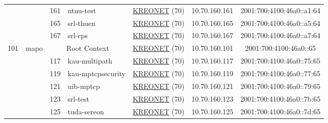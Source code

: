 \begin{small}
\begin{center}
\begin{longtable}{|c|c|c|c|c|c|c|c|}
  &  & \tiny{161} & \multicolumn{1}{|l|}{\tiny{ntnu-test}} & \multicolumn{2}{|c|}{\tiny{\href{http://www.kreonet.net}{KREONET} (70)}} & \tiny{10.70.160.161} & \tiny{2001:700:4100:46a0::a1:64} \\* \cline{3-3}\cline{4-4}\cline{5-5}\cline{6-6}\cline{7-7}\cline{8-8}
  &  & \tiny{165} & \multicolumn{1}{|l|}{\tiny{srl-thuen}} & \multicolumn{2}{|c|}{\tiny{\href{http://www.kreonet.net}{KREONET} (70)}} & \tiny{10.70.160.165} & \tiny{2001:700:4100:46a0::a5:64} \\* \cline{3-3}\cline{4-4}\cline{5-5}\cline{6-6}\cline{7-7}\cline{8-8}
  &  & \tiny{167} & \multicolumn{1}{|l|}{\tiny{srl-cps}} & \multicolumn{2}{|c|}{\tiny{\href{http://www.kreonet.net}{KREONET} (70)}} & \tiny{10.70.160.167} & \tiny{2001:700:4100:46a0::a7:64} \\ \hline
 \multirow{28}{*}{\tiny{101}} & \multicolumn{1}{|l|}{\multirow{28}{*}{\tiny{mapo}}} & \multicolumn{2}{|c|}{\tiny{Root Context}} & \multicolumn{2}{|c|}{\tiny{\href{http://www.kreonet.net}{KREONET} (70)}} & \tiny{10.70.160.101} & \tiny{2001:700:4100:46a0::65} \\* \cline{3-3}\cline{4-4}\cline{5-5}\cline{6-6}\cline{7-7}\cline{8-8}
  &  & \tiny{117} & \multicolumn{1}{|l|}{\tiny{kau-multipath}} & \multicolumn{2}{|c|}{\tiny{\href{http://www.kreonet.net}{KREONET} (70)}} & \tiny{10.70.160.117} & \tiny{2001:700:4100:46a0::75:65} \\* \cline{3-3}\cline{4-4}\cline{5-5}\cline{6-6}\cline{7-7}\cline{8-8}
  &  & \tiny{119} & \multicolumn{1}{|l|}{\tiny{kau-mptcpsecurity}} & \multicolumn{2}{|c|}{\tiny{\href{http://www.kreonet.net}{KREONET} (70)}} & \tiny{10.70.160.119} & \tiny{2001:700:4100:46a0::77:65} \\* \cline{3-3}\cline{4-4}\cline{5-5}\cline{6-6}\cline{7-7}\cline{8-8}
  &  & \tiny{121} & \multicolumn{1}{|l|}{\tiny{uib-mptcp}} & \multicolumn{2}{|c|}{\tiny{\href{http://www.kreonet.net}{KREONET} (70)}} & \tiny{10.70.160.121} & \tiny{2001:700:4100:46a0::79:65} \\* \cline{3-3}\cline{4-4}\cline{5-5}\cline{6-6}\cline{7-7}\cline{8-8}
  &  & \tiny{123} & \multicolumn{1}{|l|}{\tiny{srl-test}} & \multicolumn{2}{|c|}{\tiny{\href{http://www.kreonet.net}{KREONET} (70)}} & \tiny{10.70.160.123} & \tiny{2001:700:4100:46a0::7b:65} \\* \cline{3-3}\cline{4-4}\cline{5-5}\cline{6-6}\cline{7-7}\cline{8-8}
  &  & \tiny{125} & \multicolumn{1}{|l|}{\tiny{tuda-sereon}} & \multicolumn{2}{|c|}{\tiny{\href{http://www.kreonet.net}{KREONET} (70)}} & \tiny{10.70.160.125} & \tiny{2001:700:4100:46a0::7d:65} \\* \cline{3-3}\cline{4-4}\cline{5-5}\cline{6-6}\cline{7-7}\cline{8-8}

\end{longtable}
\end{center}
\end{small}
